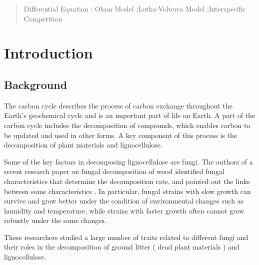 \documentclass{mcmthesis}
\begin{document}
\begin{abstract}

\begin{keywords}
Differential Equation ; Olson Model ;Lotka-Volterra Model ;Interspecific Competition
\end{keywords}
\end{abstract}
\maketitle

\newpage
\tableofcontents
\thispagestyle{empty}


\newpage
\setcounter{page}{1}
\section{Introduction}
\subsection{Background}
The carbon cycle describes the process of carbon exchange throughout the Earth's geochemical cycle and is an important part of life on Earth. A part of the carbon cycle includes the decomposition of compounds, which enables carbon to be updated and used in other forms. A key component of this process is the decomposition of plant materials and lignocellulose. 

Some of the key factors in decomposing lignocellulose are fungi. The authors of a recent research paper on fungal decomposition of wood identified fungal characteristics that determine the decomposition rate, and pointed out the links between some characteristics . In particular, fungal strains with slow growth can survive and grow better under the condition of environmental changes such as humidity and temperature, while strains with faster growth often cannot grow robustly under the same changes.

These researchers studied a large number of traits related to different fungi and their roles in the decomposition of ground litter ( dead plant materials ) and lignocellulose.
\end{document}
